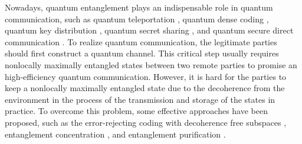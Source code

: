 \documentclass[preprintnumbers,showkeys,amsmath,amssymb]{revtex4}%
\begin{document}
Nowadays, quantum entanglement plays an indispensable role in
quantum communication, such as quantum teleportation
\cite{CHBennet1993}, quantum dense coding
\cite{CHBennet1992,superdense}, quantum key distribution
\cite{AKEkert,bbm92}, quantum secret sharing \cite{MHillery}, and
quantum secure direct communication
\cite{longliupra,FGDeng2003,twostepexp,twostepexp2}. To realize
quantum communication, the legitimate parties should first construct
a quantum channel. This critical  step usually requires nonlocally
maximally entangled states between two  remote parties to promise an
high-efficiency quantum communication. However, it is hard for the
parties to keep a nonlocally maximally entangled state due to the
decoherence from the environment in the process of the transmission
and storage of the states in practice. To overcome this problem,
some effective approaches have been proposed, such as the
error-rejecting coding with decoherence free subspaces
\cite{DFS1,DFS2,DFS3}, entanglement concentration
\cite{CHBennett1996,YBSheng2008,BCRen012302,Lixhpraecp,Lixhpraecp2,caocecpoe,caocecpaop,Renbcaop,HZhangPRA2017},
 and entanglement purification
\cite{EPP1,DDeutschPRL1996,JWPannature2001,Simon2002,YBShengPRA2008,EPP2,EPP3,EPP4,DEPPDeng,EPP5,EPPwanggy,DuFFHEPP,EPPwangc,EPPadd1,EPPadd2,EPPadd3,EPPadd4,zhanghaoepp}.
\end{document}
